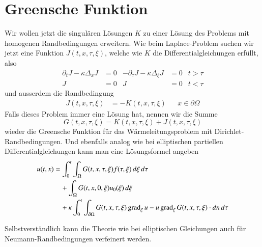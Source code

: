 %
%
%
\section{Greensche Funktion}
Wir wollen jetzt die singulären Lösungen $K$ zu einer Lösung des Problems
mit homogenen Randbedingungen erweitern.
Wie beim Laplace-Problem suchen wir jetzt eine Funktion $J(t,x,\tau,\xi)$,
welche wie $K$ die Differentialgleichungen erfüllt, also
\begin{align*}
\partial_t J-\kappa\Delta_xJ&=0
&
-\partial_\tau J-\kappa\Delta_\xi J&=0
&t>\tau
\\
J&=0&J&=0&t<\tau
\end{align*}
und ausserdem die Randbedingung 
\begin{align*}
J(t,x,\tau,\xi)&=-K(t,x,\tau,\xi)&&x\in\partial\Omega
\end{align*}
Falls dieses Problem immer eine Lösung hat, nennen wir die
Summe
\[
G(t,x,\tau,\xi)=K(t,x,\tau,\xi)+J(t,x,\tau,\xi)
\]
wieder die Greensche Funktion für das Wärmeleitungsproblem
mit Dirichlet-Rand\-bedingungen. Und ebenfalls analog wie bei elliptischen
partiellen Differentialgleichungen kann man eine Lösungsformel
angeben
\begin{align}
u(t,x)&=
\int_0^t\int_{\Omega}G(t,x,\tau,\xi)f(\tau,\xi)\,d\xi\,d\tau
\notag
\\
&\quad+\int_{\Omega}G(t,x,0,\xi)u_0(\xi)\,d\xi
\notag
\\
&\quad +\kappa\int_0^t\int_{\partial \Omega}
G(t,x,\tau,\xi)\operatorname{grad}_\xi u
-u\operatorname{grad}_\xi G(t,x,\tau,\xi)\cdot dn\,d\tau
\label{green-parabolisch}
\end{align}

Selbstverständlich kann die Theorie wie bei elliptischen Gleichungen
auch für Neumann-Randbedingungen verfeinert werden.

